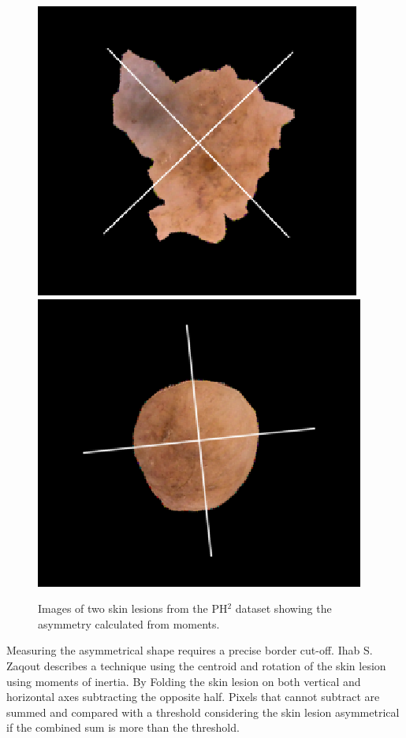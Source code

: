 \begin{figure} 
\centering
\includegraphics[scale=0.5]{images/asym1.png}
\includegraphics[scale=0.5]{images/asym2.png}
\caption{Images of two skin lesions from the PH$^2$ dataset showing the asymmetry calculated from moments.}
\end{figure} \label{lit-asym}

Measuring the asymmetrical shape requires a precise border cut-off. Ihab S. Zaqout\cite{Zaqout2016} describes a technique using the centroid and rotation of the skin lesion using moments of inertia. By Folding the skin lesion on both vertical and horizontal axes subtracting the opposite half. Pixels that cannot subtract are summed and compared with a threshold considering the skin lesion asymmetrical if the combined sum is more than the threshold.

